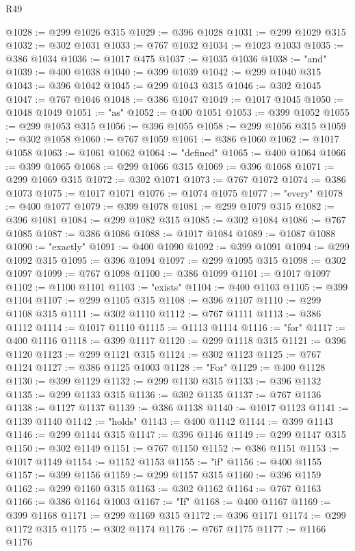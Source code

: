 \begin{lexlean}{R49}
\begin{coremodule}
@1028 := @299 @1026 @315
@1029 := @396 @1028
@1031 := @299 @1029 @315
@1032 := @302 @1031
@1033 := @767 @1032
@1034 := @1023 @1033
@1035 := @386 @1034
@1036 := @1017 @475
@1037 := @1035 @1036
@1038 := "and"
@1039 := @400 @1038
@1040 := @399 @1039
@1042 := @299 @1040 @315
@1043 := @396 @1042
@1045 := @299 @1043 @315
@1046 := @302 @1045
@1047 := @767 @1046
@1048 := @386 @1047
@1049 := @1017 @1045
@1050 := @1048 @1049
@1051 := "as"
@1052 := @400 @1051
@1053 := @399 @1052
@1055 := @299 @1053 @315
@1056 := @396 @1055
@1058 := @299 @1056 @315
@1059 := @302 @1058
@1060 := @767 @1059
@1061 := @386 @1060
@1062 := @1017 @1058
@1063 := @1061 @1062
@1064 := "defined"
@1065 := @400 @1064
@1066 := @399 @1065
@1068 := @299 @1066 @315
@1069 := @396 @1068
@1071 := @299 @1069 @315
@1072 := @302 @1071
@1073 := @767 @1072
@1074 := @386 @1073
@1075 := @1017 @1071
@1076 := @1074 @1075
@1077 := "every"
@1078 := @400 @1077
@1079 := @399 @1078
@1081 := @299 @1079 @315
@1082 := @396 @1081
@1084 := @299 @1082 @315
@1085 := @302 @1084
@1086 := @767 @1085
@1087 := @386 @1086
@1088 := @1017 @1084
@1089 := @1087 @1088
@1090 := "exactly"
@1091 := @400 @1090
@1092 := @399 @1091
@1094 := @299 @1092 @315
@1095 := @396 @1094
@1097 := @299 @1095 @315
@1098 := @302 @1097
@1099 := @767 @1098
@1100 := @386 @1099
@1101 := @1017 @1097
@1102 := @1100 @1101
@1103 := "exists"
@1104 := @400 @1103
@1105 := @399 @1104
@1107 := @299 @1105 @315
@1108 := @396 @1107
@1110 := @299 @1108 @315
@1111 := @302 @1110
@1112 := @767 @1111
@1113 := @386 @1112
@1114 := @1017 @1110
@1115 := @1113 @1114
@1116 := "for"
@1117 := @400 @1116
@1118 := @399 @1117
@1120 := @299 @1118 @315
@1121 := @396 @1120
@1123 := @299 @1121 @315
@1124 := @302 @1123
@1125 := @767 @1124
@1127 := @386 @1125 @1003
@1128 := "For"
@1129 := @400 @1128
@1130 := @399 @1129
@1132 := @299 @1130 @315
@1133 := @396 @1132
@1135 := @299 @1133 @315
@1136 := @302 @1135
@1137 := @767 @1136
@1138 := @1127 @1137
@1139 := @386 @1138
@1140 := @1017 @1123
@1141 := @1139 @1140
@1142 := "holds"
@1143 := @400 @1142
@1144 := @399 @1143
@1146 := @299 @1144 @315
@1147 := @396 @1146
@1149 := @299 @1147 @315
@1150 := @302 @1149
@1151 := @767 @1150
@1152 := @386 @1151
@1153 := @1017 @1149
@1154 := @1152 @1153
@1155 := "if"
@1156 := @400 @1155
@1157 := @399 @1156
@1159 := @299 @1157 @315
@1160 := @396 @1159
@1162 := @299 @1160 @315
@1163 := @302 @1162
@1164 := @767 @1163
@1166 := @386 @1164 @1003
@1167 := "If"
@1168 := @400 @1167
@1169 := @399 @1168
@1171 := @299 @1169 @315
@1172 := @396 @1171
@1174 := @299 @1172 @315
@1175 := @302 @1174
@1176 := @767 @1175
@1177 := @1166 @1176

\end{coremodule}
\end{lexlean}
